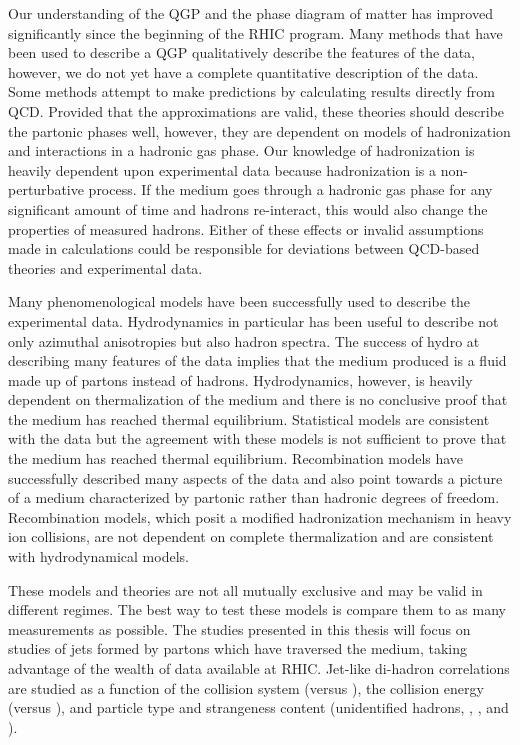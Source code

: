 Our understanding of the QGP and the phase diagram of matter has improved significantly since the beginning of the RHIC program.  Many methods that have been used to describe a QGP qualitatively describe the features of the data, however, we do not yet have a complete quantitative description of the data.  Some methods attempt to make predictions by calculating results directly from QCD.  Provided that the approximations are valid, these theories should describe the partonic phases well, however, they are dependent on models of hadronization and interactions in a hadronic gas phase.  Our knowledge of hadronization is heavily dependent upon experimental data because hadronization is a non-perturbative process.  If the medium goes through a hadronic gas phase for any significant amount of time and hadrons re-interact, this would also change the properties of measured hadrons.  Either of these effects or invalid assumptions made in calculations could be responsible for deviations between QCD-based theories and experimental data.

Many phenomenological models have been successfully used to describe the experimental data.  Hydrodynamics in particular has been useful to describe not only azimuthal anisotropies but also hadron spectra.  The success of hydro at describing many features of the data implies that the medium produced is a fluid made up of partons instead of hadrons.  Hydrodynamics, however, is heavily dependent on thermalization of the medium and there is no conclusive proof that the medium has reached thermal equilibrium.  Statistical models are consistent with the data but the agreement with these models is not sufficient to prove that the medium has reached thermal equilibrium.  Recombination models have successfully described many aspects of the data and also point towards a picture of a medium characterized by partonic rather than hadronic degrees of freedom.  Recombination models, which posit a modified hadronization mechanism in heavy ion collisions, are not dependent on complete thermalization and are consistent with hydrodynamical models.

These models and theories are not all mutually exclusive and may be valid in different regimes.  The best way to test these models is compare them to as many measurements as possible.  The studies presented in this thesis will focus on studies of jets formed by partons which have traversed the medium, taking advantage of the wealth of data available at RHIC.  Jet-like di-hadron correlations are studied as a function of the collision system (\Cu versus \Au), the collision energy (\sNNsixtytwo versus \sNNtwohundred), and particle type and strangeness content (unidentified hadrons, \lam, \kaon, and \myxi).

